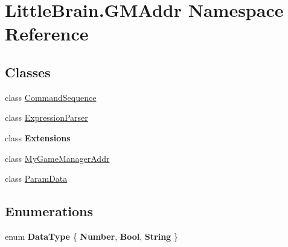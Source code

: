 \hypertarget{namespace_little_brain_1_1_g_m_addr}{}\section{Little\+Brain.\+G\+M\+Addr Namespace Reference}
\label{namespace_little_brain_1_1_g_m_addr}
\subsection*{Classes}
\begin{DoxyCompactItemize}
\item 
class \hyperlink{class_little_brain_1_1_g_m_addr_1_1_command_sequence}{Command\+Sequence}
\item 
class \hyperlink{class_little_brain_1_1_g_m_addr_1_1_expression_parser}{Expression\+Parser}
\item 
class {\bfseries Extensions}
\item 
class \hyperlink{class_little_brain_1_1_g_m_addr_1_1_my_game_manager_addr}{My\+Game\+Manager\+Addr}
\item 
class \hyperlink{class_little_brain_1_1_g_m_addr_1_1_param_data}{Param\+Data}
\end{DoxyCompactItemize}
\subsection*{Enumerations}
\begin{DoxyCompactItemize}
\item 
enum {\bfseries Data\+Type} \{ {\bfseries Number}, 
{\bfseries Bool}, 
{\bfseries String}
 \}\hypertarget{namespace_little_brain_1_1_g_m_addr_ab822df7ff79cd3549adc2758596374f4}{}\label{namespace_little_brain_1_1_g_m_addr_ab822df7ff79cd3549adc2758596374f4}

\end{DoxyCompactItemize}
